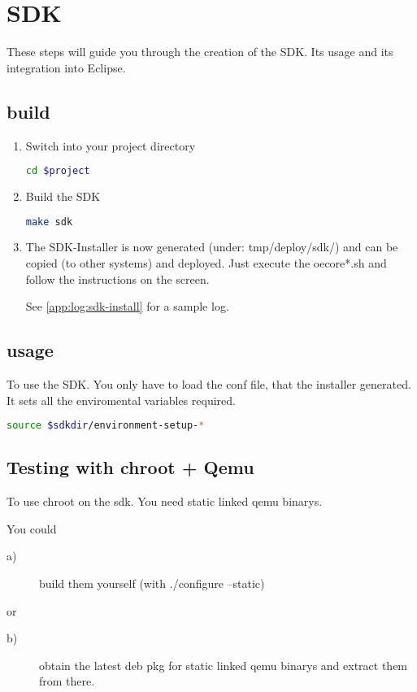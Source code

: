 \chapter{SDK}
\label{chap:sdk}

These steps will guide you through the creation of the SDK. Its usage and its
integration into Eclipse.

\section{build}
\label{sec:sdk_build}

\begin{enumerate}
\item Switch into your project directory
  \begin{lstlisting}[language=bash]
    cd $project
  \end{lstlisting}%
\item Build the SDK
  \begin{lstlisting}[language=bash]
    make sdk
  \end{lstlisting}
\item The SDK-Installer is now generated (under: tmp/deploy/sdk/) and can be
  copied (to other systems) and deployed. Just execute the oecore*.sh and follow
  the instructions on the screen.

  See \autoref{app:log:sdk-install} for a sample log.

\end{enumerate}

\section{usage}
\label{sec:sdk_usage}
To use the SDK. You only have to load the conf file, that the installer
generated. It sets all the enviromental variables required.

\begin{lstlisting}[language=bash]
  source $sdkdir/environment-setup-*
\end{lstlisting}

\section{Testing with chroot + Qemu}
\label{sec:sdk_chroot}

To use chroot on the sdk. You need static linked qemu binarys.

You could
\begin{description}
  \item[a)] build them yourself (with ./configure --static)
\end{description}
or
\begin{description}
  \item[b)] obtain the latest deb pkg for static linked qemu binarys and extract
    them from there.
\end{description}

